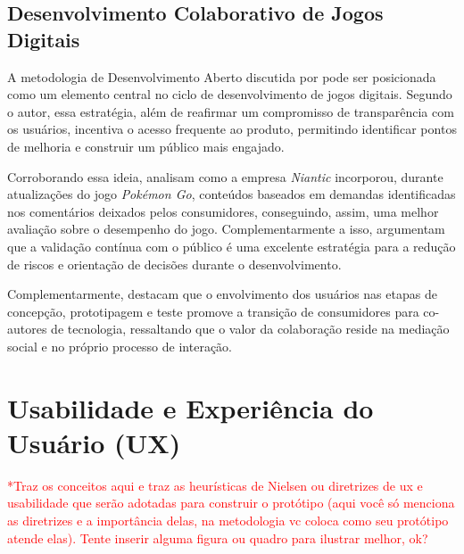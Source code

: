\subsection{Desenvolvimento Colaborativo de Jogos Digitais}

A metodologia de Desenvolvimento Aberto discutida por  pode ser posicionada como um elemento central no ciclo de desenvolvimento de jogos digitais. Segundo o autor, essa estratégia, além de reafirmar um compromisso de transparência com os usuários, incentiva o acesso frequente ao produto, permitindo identificar pontos de melhoria e construir um público mais engajado.

Corroborando essa ideia,  analisam como a empresa \textit{Niantic} incorporou, durante atualizações do jogo \textit{Pokémon Go}, conteúdos baseados em demandas identificadas nos comentários deixados pelos consumidores, conseguindo, assim, uma melhor avaliação sobre o desempenho do jogo. Complementarmente a isso,  argumentam que a validação contínua com o público é uma excelente estratégia para a redução de riscos e orientação de decisões durante o desenvolvimento.

Complementarmente,  destacam que o envolvimento dos usuários nas etapas de concepção, prototipagem e teste promove a transição de consumidores para co-autores de tecnologia, ressaltando que o valor da colaboração reside na mediação social e no próprio processo de interação.


\section{Usabilidade e Experiência do Usuário (UX)}

\textcolor{red}{*Traz os conceitos aqui e traz as heurísticas de Nielsen ou diretrizes de ux e usabilidade que serão adotadas para construir o protótipo (aqui você só menciona as diretrizes e a importância delas, na metodologia vc coloca como seu protótipo atende elas). 
Tente inserir alguma figura ou quadro para ilustrar melhor, ok?}


